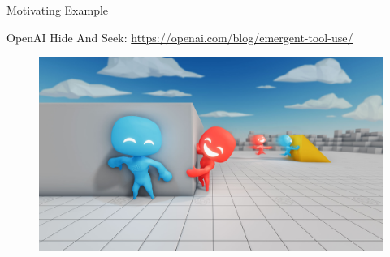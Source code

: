 \documentclass[presentation, 8pt]{beamer}\mode<presentation>{\usetheme{AMSBolognaFC}}
\begin{document}
\begin{frame}{Motivating Example}
\centering
\begin{exampleblock}{OpenAI Hide And Seek: \url{https://openai.com/blog/emergent-tool-use/}}
	\begin{figure}
		\href{https://www.youtube.com/watch?v=kopoLzvh5jY}{\includegraphics[width=\textwidth]{img/open-ai.jpg}}
	\end{figure}
\end{exampleblock}
\end{frame}
\end{document}
